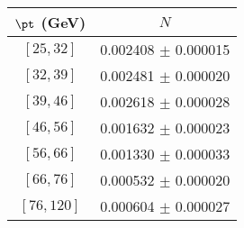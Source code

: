 \begin{tabular}{c||c}
$\pt$ (GeV) & $N$  \\
\hline
$[25, 32]$ & 0.002408 $\pm$ 0.000015\\
$[32, 39]$ & 0.002481 $\pm$ 0.000020\\
$[39, 46]$ & 0.002618 $\pm$ 0.000028\\
$[46, 56]$ & 0.001632 $\pm$ 0.000023\\
$[56, 66]$ & 0.001330 $\pm$ 0.000033\\
$[66, 76]$ & 0.000532 $\pm$ 0.000020\\
$[76, 120]$ & 0.000604 $\pm$ 0.000027\\
\end{tabular}
